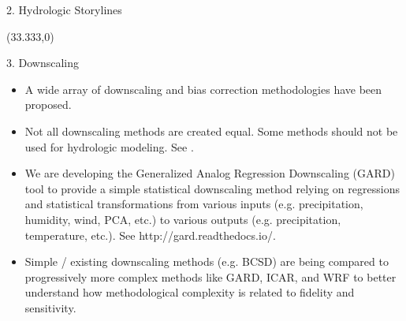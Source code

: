\documentclass{beamer}
\begin{document}
\begin{frame}{}
\begin{columns}
\begin{column}{.3333\paperwidth}
\begin{textblock}{\textwidth \TPHorizModule}
\begin{block}{2. Hydrologic Storylines}
    \end{block}
   \end{textblock}



   \begin{textblock}{\textwidth \TPHorizModule}(33.333,0)
    \begin{block}{3. Downscaling}


     \begin{itemize}
      \justifying

      \item A wide array of downscaling and bias correction methodologies have been proposed.
      \item Not all downscaling methods are created equal. Some methods should not be used for hydrologic modeling. See \citet{Gutmann_2014}.
      \item We are developing the Generalized Analog Regression Downscaling (GARD) tool to provide a simple statistical downscaling method relying on regressions and statistical transformations from various inputs (e.g. precipitation, humidity, wind, PCA, etc.) to various outputs (e.g. precipitation, temperature, etc.). See http://gard.readthedocs.io/.
      \item Simple / existing downscaling methods (e.g. BCSD) are being compared to progressively more complex methods like GARD, ICAR, and WRF to better understand how methodological complexity is related to fidelity and sensitivity.


\end{itemize}
\end{block}
\end{textblock}
\end{column}
\end{columns}
\end{frame}
\end{document}
